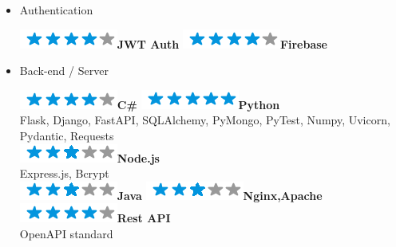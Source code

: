 \documentclass[]{friggeri-cv}
\begin{document}
\begin{flushleft}
\begin{multicols}{3}
\begin{itemize}
\item \large Authentication \
\normalsize
\begin{flushleft}

\includegraphics[scale=0.40]{res/img/4stars.png}\hspace{1.5mm}\textbf{JWT Auth}
\includegraphics[scale=0.40]{res/img/4stars.png}\hspace{1.5mm}\textbf{Firebase}
\end{flushleft}            

\columnbreak
\item \large Back-end / Server \
\normalsize
\begin{flushleft}

\includegraphics[scale=0.40]{res/img/4stars.png}\hspace{1.5mm}\textbf{C\#}
\includegraphics[scale=0.40]{res/img/5stars.png}\hspace{1.5mm}\textbf{Python}\\Flask, Django, FastAPI, SQLAlchemy, PyMongo, PyTest, Numpy, Uvicorn, Pydantic, Requests\\\vspace{2mm}
\includegraphics[scale=0.40]{res/img/3stars.png}\hspace{1.5mm}\textbf{Node.js}\\Express.js, Bcrypt\\
\includegraphics[scale=0.40]{res/img/3stars.png}\hspace{1.5mm}\textbf{Java}
\includegraphics[scale=0.40]{res/img/3stars.png}\hspace{1.5mm}\textbf{\small Nginx,Apache}
\includegraphics[scale=0.40]{res/img/4stars.png}\hspace{1.5mm}\textbf{Rest API}\\OpenAPI standard\\
\end{flushleft}            


\end{itemize}
\end{multicols}
\end{flushleft}
\end{document}
